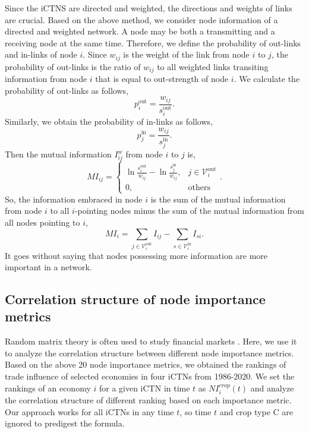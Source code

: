 \documentclass[preprint,3p,times,sort&compress]{elsarticle}
\begin{document}
Since the iCTNS are directed and weighted, the directions and weights of links are crucial. Based on the above method, we consider node information of a directed and weighted network. A node may be both a transmitting and a receiving node at the same time. Therefore, we define the probability of out-links and in-links of node $i$. Since $w_{ij}$ is the weight of the link from node $i$ to $j$, the probability of out-links is the ratio of $w_{ij}$ to all weighted links transiting information from node $i$ that is equal to out-strength of node $i$. We calculate the probability of out-links as follows,
\begin{equation}
    p^\mathrm{out}_{i}= \frac{w_{ij}}{s^\mathrm{out}_i}.
\end{equation}
Similarly, we obtain the probability of in-links as follows,
\begin{equation}
    p^{\mathrm{in}}_{j}= \frac{w_{ij}}{s^{\mathrm{in}}_j}.
\end{equation}
Then the mutual information $I_{ij}^w$ from node $i$ to $j$ is,
\begin{equation}
   MI_{ij}= \begin{cases}\ln \frac{s^\mathrm{out}_i}{w_{ij}}-\ln \frac{s^{\mathrm{in}}_j}{w_{ij}}, &j
   \in \mathscr{V}_i^\mathrm{out} \\ 0, & \text {others}
\end{cases}.
\label{Eq:mutual:information:weighted:node}
\end{equation}
So, the information embraced in node $i$ is the sum of the mutual information from node $i$ to all $i$-pointing nodes minus the sum of the mutual information from all nodes pointing to $i$,
\begin{equation}
  MI_i=\sum_{j \in \mathscr{V}^\mathrm{out}_i} I_{ij}-\sum_{s \in \mathscr{V}^{\mathrm{in}}_i} I_{si}.
\label{Eq:mutual:information:weighted}
\end{equation}
It goes without saying that nodes possessing more information are more important in a network.



\subsection{Correlation structure of node importance metrics}


Random matrix theory is often used to study financial markets \cite{Dai-Xiong-Zhou-2021-FinancResLett}. Here, we use it to analyze the correlation structure between different node importance metrics. Based on the above 20 node importance metrics, we obtained the rankings of trade influence of selected economies in four iCTNs from 1986-2020. We set the rankings of an economy $i$ for a given iCTN in time $t$ as $NI_i^{crop}(t)$ and analyze the correlation structure of different ranking based on each importance metric. Our approach works for all iCTNs in any time $t$, so time $t$ and crop type $\mathrm{C}$ are ignored to predigest the formula.
\end{document}
